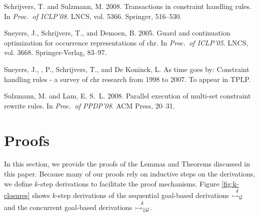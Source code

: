 \documentclass{tlp}
\begin{document}
\begin{thebibliography}{}
{\sc Schrijvers, T.} {\sc and} {\sc Sulzmann, M.} 2008.
\newblock Transactions in constraint handling rules.
\newblock In {\em Proc.\ of ICLP'08}. LNCS, vol. 5366. Springer, 516--530.

{\sc Sneyers, J.}, {\sc Schrijvers, T.}, {\sc and} {\sc Demoen, B.} 2005.
\newblock Guard and continuation optimization for occurrence representations of
  chr.
\newblock In {\em Proc.\ of ICLP'05}. LNCS, vol. 3668. Springer-Verlag, 83--97.

{\sc Sneyers, J.}, {, P.}, {\sc Schrijvers, T.}, {\sc and} {\sc
  {De Koninck}, L.}
\newblock As time goes by: Constraint handling rules - a survey of chr research
  from 1998 to 2007.
\newblock To appear in TPLP.

{\sc Sulzmann, M.} {\sc and} {\sc Lam, E. S.~L.} 2008.
\newblock Parallel execution of multi-set constraint rewrite rules.
\newblock In {\em Proc.\ of PPDP'08}. ACM Press, 20--31.

\end{thebibliography}


\section{Proofs} \label{sec:proofs}


In this section, we provide the proofs of the Lemmas and Theorems discussed in this 
paper. Because many of our proofs rely on inductive steps on the derivations, 
we define $k$-step derivations to facilitate the proof mechanisms. Figure 
\ref{fig:k-closures} shows $k$-step derivations of the sequential goal-based derivations 
$\stackrel{\delta}{\rightarrowtail_{\cal G}}$ and the concurrent goal-based derivations $\stackrel{\delta}{\rightarrowtail_{\mid\mid\cal G}}$. 
\end{document}
